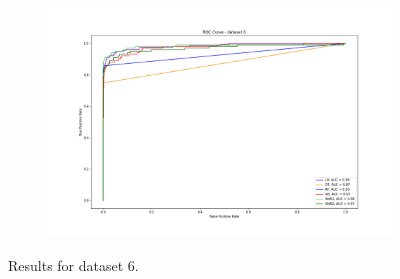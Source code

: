 \documentclass{Configuration_Files/PoliMi3i_thesis}
\begin{document}
\begin{figure}[H]
\begin{subfigure}
    \centering
    \includegraphics[scale=0.3]{Images/ROC_6.png}
\end{subfigure}
  \caption{Results for dataset 6.}
\end{figure}
\end{document}
